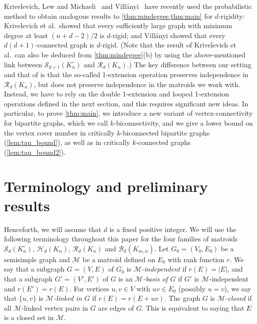 \documentclass[11pt,a4paper,dvipsnames]{scrartcl}
\newcommand{\cB}{{\mathcal{B}}}
\newcommand{\cR}{{\mathcal{R}}}
\newcommand{\cS}{{\mathcal{S}}}
\newcommand{\cH}{{\mathcal{H}}}
\newcommand{\cM}{{\mathcal{M}}}
\begin{document}
Krivelevich, Lew and Michaeli~\cite{KLM} and Vill\'anyi~\cite{vill} have recently used the probabilistic method to obtain analogous results to \cref{thm:mindegree,thm:main} for $d$-rigidity: Krivelevich et al.\ showed that every sufficiently large graph with minimum degree at least $(n+d-2)/2$ is $d$-rigid; and Vill\'anyi showed that every $d(d+1)$-connected graph is $d$-rigid. (Note that the result of Krivelevich et al.\ can also be deduced from \cref{thm:mindegree}(b) by using the above-mentioned link between $\cS_{d+1}(K_n^\circ)$  and $\cR_d(K_n)$.)
The key difference between our setting and that of \cite{KLM,vill} is that the so-called 1-extension operation preserves independence in $\cR_d(K_n)$, but does not preserve independence in the matroids we work with. Instead, we have to rely on the double 1-extension and looped 1-extension operations defined in the next section, and this requires significant new ideas. In particular, to prove \cref{thm:main}, we introduce a new variant of vertex-connectivity for bipartite graphs, which we call $k$-biconnectivity, and we give a lower bound on the vertex cover number in critically $k$-biconnected bipartite graphs (\cref{lem:tau_bound}), as well as in critically $k$-connected graphs (\cref{lem:tau_bound2}).



\section{Terminology and preliminary results}
Henceforth, we will assume that $d$ is a fixed positive integer.
We will use the following terminology throughout this paper for the four families of matroids $\cS_d(K_n^\circ)$, $\cH_d(K_n)$, $\cR_d(K_n)$ and $\cB_d(K_{m,n})$.
Let $G_0=(V_0,E_0)$ be a semisimple graph and $\cM$ be a matroid defined on $E_0$ with rank function $r$.
We say that a subgraph $G=(V,E)$ of $G_0$ is \emph{$\cM$-independent} if $r(E)=|E|$, and that a subgraph $G'=(V',E')$ of $G$ is an \emph{$\cM$-basis of $G$} if $G'$ is $\cM$-independent and $r(E') = r(E)$.  For vertices $u,v \in V$ with $uv\in E_0$ (possibly $u = v$), we say that $\{u,v\}$ is \emph{$\cM$-linked in $G$} if $r(E) = r(E+uv)$. The graph $G$ is {\em $\cM$-closed} if all $\cM$-linked vertex pairs in $G$ are edges of $G$. This is equivalent to saying that $E$ is a closed set in $\cM$.
\end{document}
